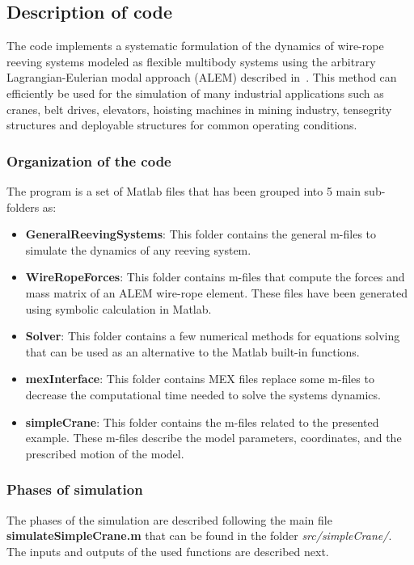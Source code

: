 \subsection{Description of code}

The code implements a systematic formulation of the dynamics of wire-rope reeving systems modeled as flexible multibody systems using the arbitrary Lagrangian-Eulerian modal approach (ALEM) described in~\cite{Escalona2022}. This method can efficiently be used for the simulation of many industrial applications such as cranes, belt drives, elevators, hoisting machines in mining industry, tensegrity structures and deployable structures for common operating conditions.

\subsubsection{Organization of the code}

The program is a set of Matlab files that has been grouped into 5 main sub-folders as:
\begin{itemize}
\item{\textbf{GeneralReevingSystems}: This folder contains the general m-files to simulate the dynamics of any reeving system.}
\item{\textbf{WireRopeForces}: This folder contains m-files that compute the forces and mass matrix of an ALEM  wire-rope element. These files have been generated using symbolic calculation in Matlab.}
\item{\textbf{Solver}: This folder contains a few numerical methods for equations solving that can be used as an alternative to the Matlab built-in functions.}
\item{\textbf{mexInterface}: This folder contains MEX files replace some m-files to decrease the computational time needed to solve the systems dynamics.}
\item{\textbf{simpleCrane}: This folder contains the m-files related to the presented example. These m-files describe the model parameters, coordinates, and the prescribed motion of the model. }
\end{itemize}

\subsubsection{Phases of simulation}

The phases of the simulation are described following the main file \textbf{simulateSimpleCrane.m} that can be found in the folder \textit{src/simpleCrane/}. The inputs and outputs of the used functions are described next. \\

